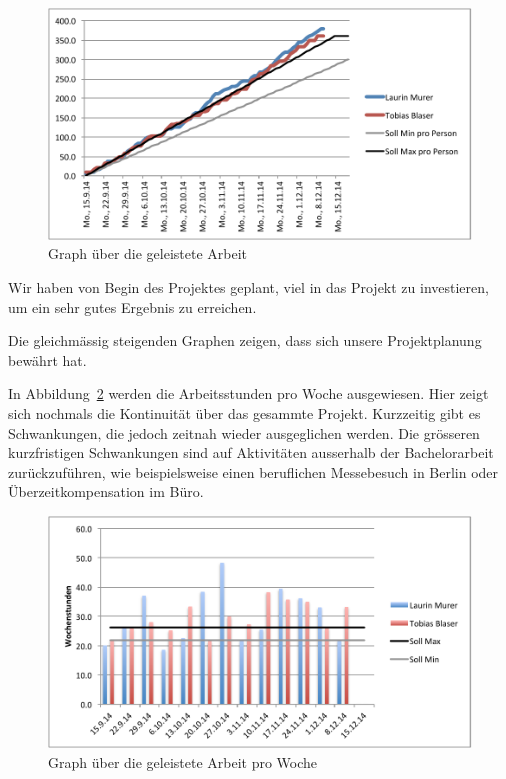	\begin{figure}[H]
		\includegraphics[width=\textwidth]{projectPlan/media/img/workGraph.pdf}
		\centering
		\caption{Graph über die geleistete Arbeit}
		\label{fig:workGraph}
	\end{figure}
	
	Wir haben von Begin des Projektes geplant, viel in das Projekt zu investieren, um ein sehr gutes Ergebnis zu erreichen.
	
	Die gleichmässig steigenden Graphen zeigen, dass sich unsere Projektplanung bewährt hat.
	
	In Abbildung\ \ref{fig:weekhours} werden die Arbeitsstunden pro Woche ausgewiesen.
	Hier zeigt sich nochmals die Kontinuität über das gesammte Projekt.
	Kurzzeitig gibt es Schwankungen, die jedoch zeitnah wieder ausgeglichen werden.
	Die grösseren kurzfristigen Schwankungen sind auf Aktivitäten ausserhalb der Bachelorarbeit zurückzuführen,
	wie beispielsweise einen beruflichen Messebesuch in Berlin oder Überzeitkompensation im Büro.

	\begin{figure}[H]
		\includegraphics[width=\textwidth]{projectPlan/media/img/weekhours.pdf}
		\centering
		\caption{Graph über die geleistete Arbeit pro Woche}
		\label{fig:weekhours}
	\end{figure}


